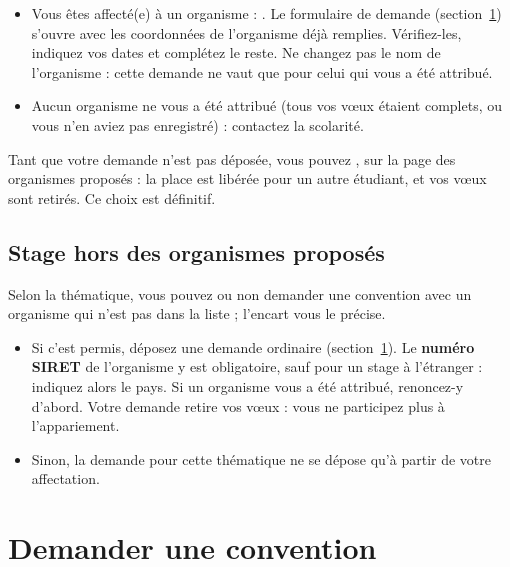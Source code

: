 \documentclass[11pt,a4paper]{article}
\begin{document}
\begin{itemize}
  \item Vous êtes affecté(e) à un organisme : . Le formulaire de demande (section~\ref{sec:demande}) s'ouvre
        avec les coordonnées de l'organisme déjà remplies. Vérifiez-les,
        indiquez vos dates et complétez le reste. Ne changez pas le nom de
        l'organisme : cette demande ne vaut que pour celui qui vous a été
        attribué.
  \item Aucun organisme ne vous a été attribué (tous vos vœux étaient complets,
        ou vous n'en aviez pas enregistré) : contactez la scolarité.
\end{itemize}

Tant que votre demande n'est pas déposée, vous pouvez , sur la page des organismes proposés : la place est libérée pour un
autre étudiant, et vos vœux sont retirés. Ce choix est définitif.


\subsection{Stage hors des organismes proposés}

Selon la thématique, vous pouvez ou non demander une convention avec un organisme
qui n'est pas dans la liste ; l'encart vous le précise.

\begin{itemize}
  \item Si c'est permis, déposez une demande ordinaire
        (section~\ref{sec:demande}). Le \textbf{numéro SIRET} de l'organisme y
        est obligatoire, sauf pour un stage à l'étranger : indiquez alors le
        pays. Si un organisme vous a été attribué, renoncez-y d'abord. Votre
        demande retire vos vœux : vous ne participez plus à l'appariement.
  \item Sinon, la demande pour cette thématique ne se dépose qu'à partir de
        votre affectation.
\end{itemize}

\section{Demander une convention}
\label{sec:demande}
\end{document}
